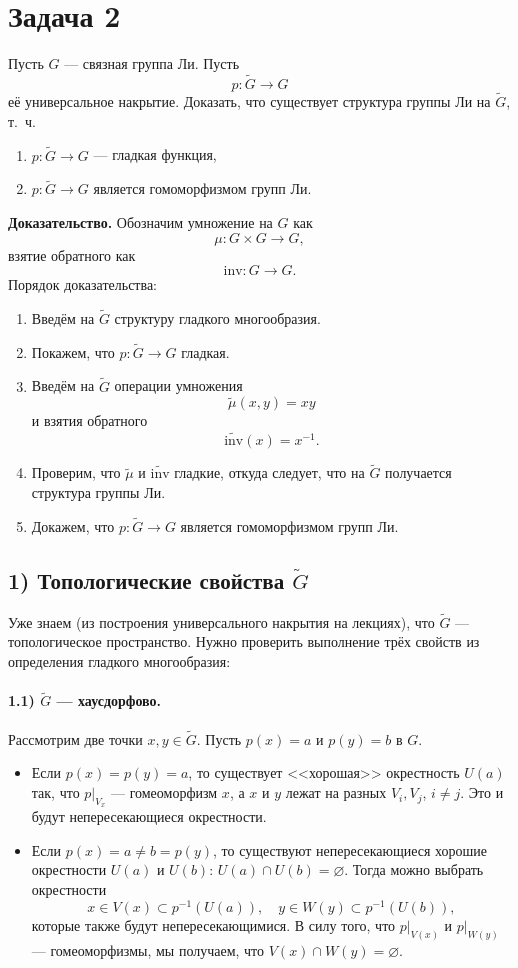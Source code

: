 \documentclass{article}
\begin{document}
\section*{Задача 2}
Пусть $G$ --- связная группа Ли. Пусть
\[
p \colon \widetilde{G} \to G
\]
её универсальное накрытие. Доказать, что существует структура группы Ли на $\widetilde{G}$, т.~ч.
\begin{enumerate}
\item $p \colon \widetilde{G} \to G$ --- гладкая функция,
\item $p \colon \widetilde{G} \to G$ является гомоморфизмом групп Ли.
\end{enumerate}

\noindent
\textbf{Доказательство.} Обозначим умножение на $G$ как
\[
\mu \colon G \times G \to G,
\]
взятие обратного как
\[
\mathrm{inv} \colon G \to G.
\]
Порядок доказательства:
\begin{enumerate}
\item Введём на $\widetilde{G}$ структуру гладкого многообразия.
\item Покажем, что $p \colon \widetilde{G} \to G$ гладкая.
\item Введём на $\widetilde{G}$ операции умножения
\[
\widetilde{\mu}(x,y) = xy
\]
и взятия обратного
\[
\widetilde{\mathrm{inv}}(x) = x^{-1}.
\]
\item Проверим, что $\widetilde{\mu}$ и $\widetilde{\mathrm{inv}}$ гладкие, откуда следует, что на $\widetilde{G}$ получается структура группы Ли.
\item Докажем, что $p \colon \widetilde{G} \to G$ является гомоморфизмом групп Ли.
\end{enumerate}

\subsection*{1) Топологические свойства $\widetilde{G}$}
Уже знаем (из построения универсального накрытия на лекциях), что $\widetilde{G}$ --- топологическое пространство. Нужно проверить выполнение трёх свойств из определения гладкого многообразия:

\paragraph{1.1) $\widetilde{G}$ --- хаусдорфово.}
Рассмотрим две точки $x, y \in \widetilde{G}$. Пусть $p(x) = a$ и $p(y) = b$ в $G$.

\begin{itemize}
\item Если $p(x) = p(y) = a$, то существует <<хорошая>> окрестность $U(a)$ так, что $p \lvert_{V_x}$ --- гомеоморфизм $x$, а $x$ и $y$ лежат на разных $V_i, V_j$, $i \neq j$. Это и будут непересекающиеся окрестности.
\item Если $p(x) = a \neq b = p(y)$, то существуют непересекающиеся хорошие окрестности $U(a)$ и $U(b)$: $U(a) \cap U(b) = \varnothing$. Тогда можно выбрать окрестности
\[
x \in V(x) \subset p^{-1}(U(a)), \quad
y \in W(y) \subset p^{-1}(U(b)),
\]
которые также будут непересекающимися. В силу того, что $p \lvert_{V(x)}$ и $p \lvert_{W(y)}$ --- гомеоморфизмы, мы получаем, что $V(x) \cap W(y) = \varnothing$.
\end{itemize}
\end{document}
